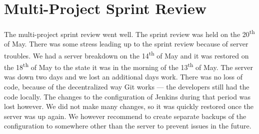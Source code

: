 \section{Multi-Project Sprint Review}\label{sec:s4_multiprj_review}
The multi-project sprint review went well. The sprint review was held on the 20\textsuperscript{th} of May. There was some stress leading up to the sprint review because of server troubles. We had a server breakdown on the 14\textsuperscript{th} of May and it was restored on the 18\textsuperscript{th} of May to the state it was in the morning of the 13\textsuperscript{th} of May. The server was down two days and we lost an additional days work. There was no loss of code, because of the decentralized way Git works --- the developers still had the code locally. The changes to the configuration of Jenkins during that period was lost however. We did not make many changes, so it was quickly restored once the server was up again. We however recommend to create separate backups of the configuration to somewhere other than the server to prevent issues in the future.